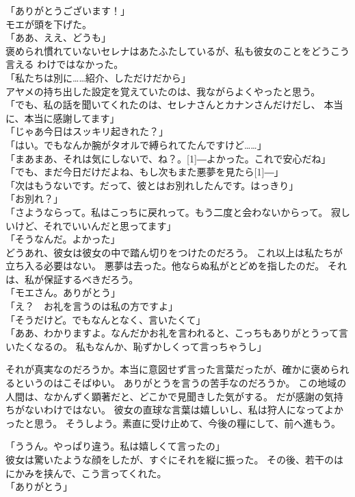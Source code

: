 \documentclass[../IHMain]{subfiles}
\begin{document}
「ありがとうございます！」\\
モエが頭を下げた。\\
「ああ、ええ、どうも」\\
褒められ慣れていないセレナはあたふたしているが、私も彼女のことをどうこう言える
わけではなかった。\\
「私たちは別に……紹介、しただけだから」\\
アヤメの持ち出した設定を覚えていたのは、我ながらよくやったと思う。\\
「でも、私の話を聞いてくれたのは、セレナさんとカナンさんだけだし、
本当に、本当に感謝してます」\\
「じゃあ今日はスッキリ起きれた？」\\
「はい。でもなんか腕がタオルで縛られてたんですけど……」\\
「まあまあ、それは気にしないで、ね？。\scalebox{3}[1]{―}よかった。これで安心だね」\\
「でも、まだ今日だけだよね、もし次もまた悪夢を見たら\scalebox{3}[1]{―}」\\
「次はもうないです。だって、彼とはお別れしたんです。はっきり」\\
「お別れ？」\\
「さようならって。私はこっちに戻れって。もう二度と会わないからって。
寂しいけど、それでいいんだと思ってます」\\
「そうなんだ。よかった」\\
どうあれ、彼女は彼女の中で踏ん切りをつけたのだろう。
これ以上は私たちが立ち入る必要はない。
悪夢は去った。他ならぬ私がとどめを指したのだ。
それは、私が保証するべきだろう。\\
「モエさん。ありがとう」\\
「え？　お礼を言うのは私の方ですよ」\\
「そうだけど。でもなんとなく、言いたくて」\\
「ああ、わかりますよ。なんだかお礼を言われると、こっちもありがとうって言いたくなるの。
私もなんか、恥ずかしくって言っちゃうし」

それが真実なのだろうか。本当に意図せず言った言葉だったが、確かに褒められるというのはこそばゆい。
ありがとうを言うの苦手なのだろうか。
この地域の人間は、なかんずく顕著だと、どこかで見聞きした気がする。
だが感謝の気持ちがないわけではない。
彼女の直球な言葉は嬉しいし、私は狩人になってよかったと思う。
そうしよう。素直に受け止めて、今後の糧にして、前へ進もう。

「ううん。やっぱり違う。私は嬉しくて言ったの」\\
彼女は驚いたような顔をしたが、すぐにそれを縦に振った。
その後、若干のはにかみを挟んで、こう言ってくれた。\\
「ありがとう」\\
\newpage
\end{document}
